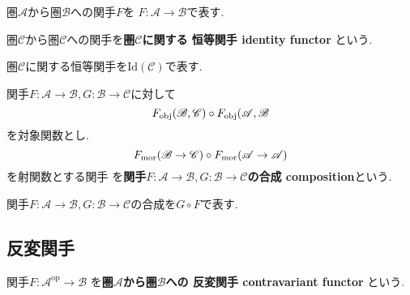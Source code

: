 \begin{Notation}
圏$\mathscr{A}$から圏$\mathscr{B}$への関手$F$を
$F:\mathscr{A}\rightarrow\mathscr{B}$で表す.
\end{Notation}
\begin{Def}
圏$\mathscr{C}$から圏$\mathscr{C}$への関手を{\bf 圏$\mathscr{C}$に関する
恒等関手 identity functor
}という.
\end{Def}
\begin{Notation}
圏$\mathscr{C}$に関する恒等関手を$\mathrm{Id}(\mathscr{C})$で表す.
\end{Notation}
\begin{Def}
関手$F:\mathscr{A}\rightarrow\mathscr{B},G:\mathscr{B}\rightarrow\mathscr{C}$に対して
\[F_{\rm obj}(\mathscr{B},\mathscr{C})\circ F_{\rm obj}(\mathscr{A},\mathscr{B}\]
を対象関数とし.
\[F_{\rm mor}(\mathscr{B}\rightarrow\mathscr{C})\circ F_{\rm mor}(\mathscr{A}\rightarrow\mathscr{A})\]
を射関数とする関手
を{\bf 関手$F:\mathscr{A}\rightarrow\mathscr{B},G:\mathscr{B}\rightarrow\mathscr{C}$の合成 composition}という.
\end{Def}
\begin{Notation}
関手$F:\mathscr{A}\rightarrow\mathscr{B},G:\mathscr{B}\rightarrow\mathscr{C}$の合成を$G\circ F$で表す.
\end{Notation}
\begin{comment}
\begin{example}
順序を保存する写像
\end{example}
\end{comment}
\begin{comment}
\begin{example}
圏と見做した順序集合間の簡単な関手の例
\end{example}
\end{comment}
\begin{comment}
*************************
\begin{example}
$n$次ホモロジー関手
\end{example}
***************************
\end{comment}

\subsection{反変関手}
\begin{Def}
関手$F:\mathscr{A}^{\mathrm{op}}\rightarrow\mathscr{B}$
を{\bf 圏$\mathscr{A}$から圏$\mathscr{B}$への
反変関手 contravariant functor
}という.
\end{Def}
